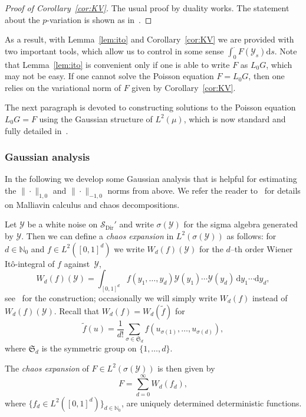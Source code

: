 \documentclass[10pt]{amsart}
\theoremstyle{definition}\newtheorem{defi}[theo]{Definition}\newtheorem{rema}[theo]{Remark}\newtheorem{exam}[theo]{Example}\newtheorem{exem}[theo]{Example}\newtheorem{nota}[theo]{Notation}
\DeclareMathOperator{\Dir}{Dir}
\newcommand{\bb}[1]{{\mathbb #1}}
\newcommand{\mc}[1]{{\mathcal #1}}
\renewcommand{\mc}[1]{{\mathcal #1}}
\newcommand{\SD}{\ensuremath{\mc S_{\Dir}}}
\newcommand*{\dd}{\mathrm{d}}
\newcommand*{\dy}{\dd y}
\newcommand*{\ds}{\dd s}
\begin{document}
\begin{proof}[Proof of Corollary~\ref{cor:KV}]
The usual proof by duality works. The statement about the $p$-variation is shown as in~\cite[Corollary~3]{Gubinelli2015Energy}.
\end{proof}

As a result, with Lemma~\ref{lem:ito} and Corollary~\ref{cor:KV} we are provided with two important tools, which allow us to control in some sense $\int_0^\cdot F(\mc Y_s)\ds$. Note that Lemma~\ref{lem:ito} is convenient only if one is able to write $F$ as $L_0G$, which may not be easy. If one cannot solve the Poisson equation $F=L_0G$, then one relies on the variational norm of $F$ given by Corollary~\ref{cor:KV}.

The next paragraph is devoted to constructing solutions to the Poisson equation $L_0G=F$ using the Gaussian structure of $L^2(\mu)$, which is now standard and fully detailed in~\cite[Section~3.2]{Gubinelli2015Energy}.

\subsubsection{Gaussian analysis}\label{ssec:gaussian}

In the following we develop some Gaussian analysis that is helpful for estimating the $\| \cdot \|_{1,0}$ and $\|\cdot \|_{-1,0}$ norms from above. We refer the reader to~\cite{Nualart2006, Janson1997} for details on Malliavin calculus and chaos decompositions.

Let $\mc Y$ be a white noise on $\SD'$ and write $\sigma(\mc Y)$ for the sigma algebra generated by $\mc Y$. Then we can define a \emph{chaos expansion} in $L^2(\sigma(\mc Y))$ as follows: for $d \in \bb N_0$ and $f \in L^2([0,1]^d)$ we write $W_d(f)(\mc Y)$ for the $d$--th order Wiener It\^o-integral of $f$ against~$\mc Y$,
\[
W_d(f)(\mc Y) = \int_{[0,1]^d} f(y_1, \dots, y_d) \mc Y(y_1) \cdots \mc Y(y_d) \, \dy_1 \cdots \dy_d,
\]
see~\cite[Section~1.1.2]{Nualart2006} for the construction; occasionally we will simply write $W_d(f)$ instead of $W_d(f)(\mc Y)$. Recall that $W_d(f) = W_d(\widetilde f)$ for
\[
\widetilde{f} (u) = \frac{1}{d!} \sum_{\sigma \in \mathfrak{S}_d} f (u_{\sigma (1)}, \ldots, u_{\sigma (d)}),
\]
where $\mathfrak{S}_d$ is the symmetric group on $\{1,\dots,d\}$.

The \emph{chaos expansion} of $F \in L^2(\sigma(\mc Y))$ is then given by
\[
F = \sum_{d=0}^\infty W_d(f_d),
\]
where $\{f_d \in L^2([0,1]^d)\}_{d \in \bb N_0}$, are uniquely determined deterministic functions.
\end{document}
